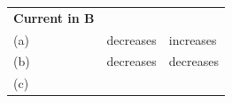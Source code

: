 \begin{enumerate}[noitemsep, label=\textbf{\arabic*}. ]
\begin{enumerate}[noitemsep, label=\textbf{\alph*}. ]
{{\begin{center}
\begin{xtabular}[t]{|l|l|l|}
        \textbf{Current in B}%
     \tabularnewline{}
    
    
        (a) &
    
    
        decreases &
    
    
        increases%
     \tabularnewline{}
    
    
        (b) &
    
    
        decreases &
    
    
        decreases%
     \tabularnewline{}
    
    
        (c) &
    

\end{xtabular}
\end{center}}}
\end{enumerate}
\end{enumerate}
